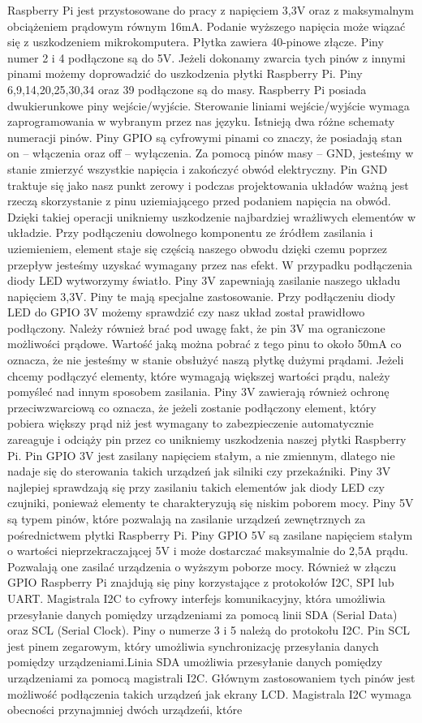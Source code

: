Raspberry Pi jest przystosowane do pracy z napięciem 3,3V oraz z maksymalnym obciążeniem prądowym równym 16mA. Podanie wyższego napięcia może wiązać się z uszkodzeniem mikrokomputera. Płytka zawiera 40-pinowe złącze. Piny numer 2 i 4 podłączone są do 5V. Jeżeli dokonamy zwarcia tych pinów z innymi pinami możemy doprowadzić do uszkodzenia płytki Raspberry Pi. Piny 6,9,14,20,25,30,34 oraz 39 podłączone są do masy. Raspberry Pi posiada dwukierunkowe piny wejście/wyjście. Sterowanie liniami wejście/wyjście wymaga zaprogramowania w wybranym przez nas języku. Istnieją dwa różne schematy numeracji pinów. Piny GPIO są cyfrowymi pinami co znaczy, że posiadają stan on – włączenia oraz off – wyłączenia. Za pomocą pinów masy – GND, jesteśmy w stanie zmierzyć wszystkie napięcia i zakończyć obwód elektryczny. Pin GND traktuje się jako nasz punkt zerowy i podczas projektowania układów ważną jest rzeczą skorzystanie z pinu uziemiającego przed podaniem napięcia na obwód. Dzięki takiej operacji unikniemy uszkodzenie najbardziej wrażliwych elementów w układzie. Przy podłączeniu dowolnego komponentu ze źródłem zasilania i uziemieniem, element staje się częścią naszego obwodu dzięki czemu poprzez przepływ jesteśmy uzyskać wymagany przez nas efekt. W przypadku podłączenia diody LED wytworzymy światło. Piny 3V zapewniają zasilanie naszego układu napięciem 3,3V. Piny te mają specjalne zastosowanie. Przy podłączeniu diody LED do GPIO 3V możemy sprawdzić czy nasz układ został prawidłowo podłączony. Należy również brać pod uwagę fakt, że pin 3V ma ograniczone możliwości prądowe. Wartość jaką można pobrać z tego pinu to około 50mA co oznacza, że nie jesteśmy w stanie obsłużyć naszą płytkę dużymi prądami. Jeżeli chcemy podłączyć elementy, które wymagają większej wartości prądu, należy pomyśleć nad innym sposobem zasilania. Piny 3V zawierają również ochronę przeciwzwarciową co oznacza, że jeżeli zostanie podłączony element, który pobiera większy prąd niż jest wymagany to zabezpieczenie automatycznie zareaguje i odciąży pin przez co unikniemy uszkodzenia naszej płytki Raspberry Pi. Pin GPIO 3V jest zasilany napięciem stałym, a nie zmiennym, dlatego nie nadaje się do sterowania takich urządzeń jak silniki czy przekaźniki. Piny 3V najlepiej sprawdzają się przy zasilaniu takich elementów jak diody LED czy czujniki, ponieważ elementy te charakteryzują się niskim poborem mocy. Piny 5V są typem pinów, które pozwalają na zasilanie urządzeń zewnętrznych za pośrednictwem płytki Raspberry Pi. Piny GPIO 5V są zasilane napięciem stałym o wartości nieprzekraczającej 5V i może dostarczać maksymalnie do 2,5A prądu. Pozwalają one zasilać urządzenia o wyższym poborze mocy. Również w złączu GPIO Raspberry Pi znajdują się piny korzystające z protokołów I2C, SPI lub UART. Magistrala I2C to cyfrowy interfejs komunikacyjny, która umożliwia przesyłanie danych pomiędzy urządzeniami za pomocą linii SDA (Serial Data) oraz SCL (Serial Clock). Piny o numerze 3 i 5 należą do protokołu I2C. Pin SCL jest pinem zegarowym, który umożliwia synchronizację przesyłania danych pomiędzy urządzeniami.Linia SDA umożliwia przesyłanie danych pomiędzy urządzeniami za pomocą magistrali I2C. Głównym zastosowaniem tych pinów jest możliwość podłączenia takich urządzeń jak ekrany LCD. Magistrala I2C wymaga obecności przynajmniej dwóch urządzeńi, które 